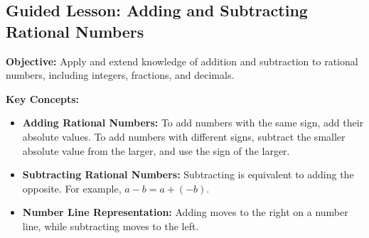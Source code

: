 \documentclass[12pt]{article}
\title{}
\date{}
\begin{document}
\subsection*{Guided Lesson: Adding and Subtracting Rational Numbers}
\onehalfspacing

\begin{tcolorbox}[colframe=black!40, colback=gray!5, 
coltitle=black, colbacktitle=black!20, fonttitle=\bfseries\Large, 
title=Learning Objective, halign title=center, left=5pt, right=5pt, top=5pt, bottom=15pt]
\textbf{Objective:} Apply and extend knowledge of addition and subtraction to rational numbers, including integers, fractions, and decimals.
\end{tcolorbox}

\vspace{1em}

\begin{tcolorbox}[colframe=black!60, colback=white, 
coltitle=black, colbacktitle=black!15, fonttitle=\bfseries\Large, 
title=Key Concepts and Vocabulary, halign title=center, left=10pt, right=10pt, top=10pt, bottom=15pt]
\textbf{Key Concepts:}
\begin{itemize}
    \item \textbf{Adding Rational Numbers:} To add numbers with the same sign, add their absolute values. To add numbers with different signs, subtract the smaller absolute value from the larger, and use the sign of the larger.
    \item \textbf{Subtracting Rational Numbers:} Subtracting is equivalent to adding the opposite. For example, \( a - b = a + (-b) \).
    \item \textbf{Number Line Representation:} Adding moves to the right on a number line, while subtracting moves to the left.
\end{itemize}
\end{tcolorbox}

\vspace{1em}
\end{document}
